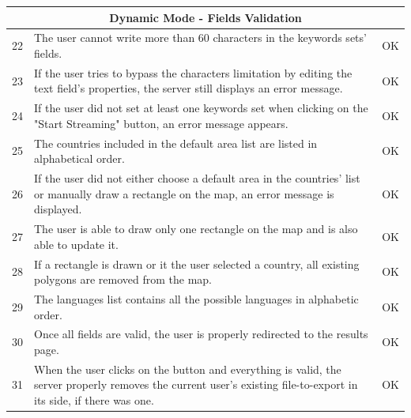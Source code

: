 \documentclass[a4paper,11pt]{report}
\begin{document}
\begin{center}
\begin{longtable}{|l|p{10cm}|p{4.4cm}|}
	
	\multicolumn{3}{|c|}{\textbf{Dynamic Mode - Fields Validation}}\\\hline	
	22 & The user cannot write more than 60 characters in the keywords sets' fields. & \color{ForestGreen}OK\color{black}\\\hline
	23 & If the user tries to bypass the characters limitation by editing the text field's properties, the server still displays an error message. & \color{ForestGreen}OK\color{black}\\\hline
	24 & If the user did not set at least one keywords set when clicking on the "Start Streaming" button, an error message appears. & \color{ForestGreen}OK\color{black}\\\hline
	25 & The countries included in the default area list are listed in alphabetical order. & \color{ForestGreen}OK\color{black}\\\hline
	26 & If the user did not either choose a default area in the countries' list or manually draw a rectangle on the map, an error message is displayed. & \color{ForestGreen}OK\color{black}\\\hline
	27 & The user is able to draw only one rectangle on the map and is also able to update it. & \color{ForestGreen}OK\color{black}\\\hline
	28 & If a rectangle is drawn or it the user selected a country, all existing polygons are removed from the map. & \color{ForestGreen}OK\color{black}\\\hline
	29 & The languages list contains all the possible languages in alphabetic order. & \color{ForestGreen}OK\color{black}\\\hline
	30 & Once all fields are valid, the user is properly redirected to the results page. & \color{ForestGreen}OK\color{black}\\\hline
	31 & When the user clicks on the button and everything is valid, the server properly removes the current user's existing file-to-export in its side, if there was one. & \color{ForestGreen}OK\color{black}\\\hline
	

\end{longtable}
\end{center}
\end{document}
